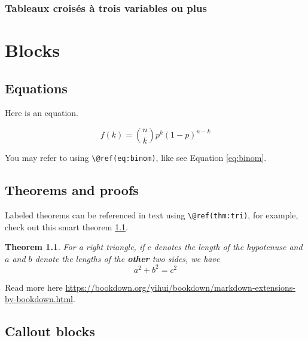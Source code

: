 \documentclass[
]{book}
\newtheorem{theorem}{Theorem}[chapter]
\theoremstyle{definition}
\theoremstyle{definition}
\theoremstyle{definition}
\theoremstyle{definition}
\theoremstyle{remark}
\begin{document}
\hypertarget{tableaux-croisuxe9s-uxe0-trois-variables-ou-plus}{%
\subsection{Tableaux croisés à trois variables ou plus}\label{tableaux-croisuxe9s-uxe0-trois-variables-ou-plus}}

\hypertarget{blocks}{%
\chapter{Blocks}\label{blocks}}

\hypertarget{equations}{%
\section{Equations}\label{equations}}

Here is an equation.

\begin{equation} 
  f\left(k\right) = \binom{n}{k} p^k\left(1-p\right)^{n-k}
  \label{eq:binom}
\end{equation}

You may refer to using \texttt{\textbackslash{}@ref(eq:binom)}, like see Equation \eqref{eq:binom}.

\hypertarget{theorems-and-proofs}{%
\section{Theorems and proofs}\label{theorems-and-proofs}}

Labeled theorems can be referenced in text using \texttt{\textbackslash{}@ref(thm:tri)}, for example, check out this smart theorem \ref{thm:tri}.

\begin{theorem}
\protect\hypertarget{thm:tri}{}\label{thm:tri}For a right triangle, if \(c\) denotes the \emph{length} of the hypotenuse
and \(a\) and \(b\) denote the lengths of the \textbf{other} two sides, we have
\[a^2 + b^2 = c^2\]
\end{theorem}

Read more here \url{https://bookdown.org/yihui/bookdown/markdown-extensions-by-bookdown.html}.

\hypertarget{callout-blocks}{%
\section{Callout blocks}\label{callout-blocks}}
\end{document}
